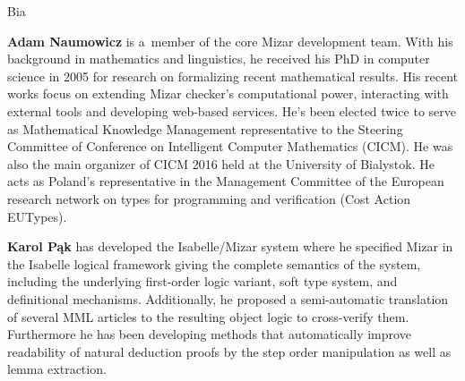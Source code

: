 \begin{sitedescription}{Bia}
\begin{compactitem}
\item\textbf{Adam Naumowicz} is a~member of the core Mizar development team. 
With his background in mathematics and linguistics, he received his PhD in computer science in 2005
for research on formalizing recent mathematical results. His recent works focus on extending Mizar checker's computational power, 
interacting with external tools and developing web-based services. 
He's been elected twice to serve as Mathematical Knowledge Management representative to the Steering Committee
of Conference on Intelligent Computer Mathematics (CICM).
He was also the main organizer of CICM 2016 held at the University of Bialystok. 
He acts as Poland's representative in the Management Committee of the European research network on types
 for programming and verification (Cost Action EUTypes).

\item\textbf{Karol Pąk} has developed the Isabelle/Mizar system where
he specified Mizar in the Isabelle logical framework
giving the complete semantics of the system, including
the underlying first-order logic variant, soft type system, and definitional mechanisms.
Additionally, he proposed a semi-automatic translation of several MML articles
to the resulting object logic to cross-verify them.
Furthermore he has been developing methods
that automatically improve readability of natural deduction proofs
by the step order manipulation as well as lemma extraction.

\end{compactitem}

\end{sitedescription}


